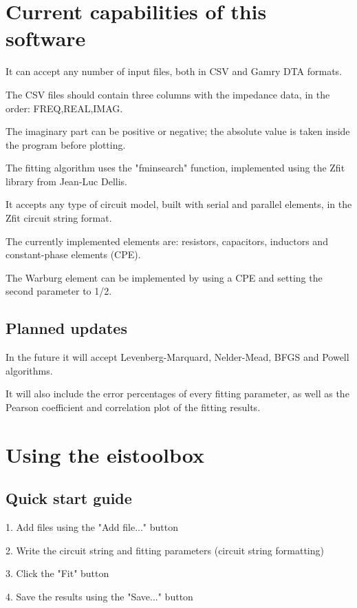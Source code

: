 \documentclass[10pt,a4paper,oneside]{book}
\begin{document}
\chapter{Current capabilities of this software}

It can accept any number of input files, both in CSV and Gamry DTA formats.

The CSV files should contain three columns with the impedance data, in the order: FREQ,REAL,IMAG. 

The imaginary part can be positive or negative; the absolute value is taken inside the program before plotting.

The fitting algorithm uses the "fminsearch" function, implemented using the Zfit library from Jean-Luc Dellis. 

It accepts any type of circuit model, built with serial and parallel elements, in the Zfit circuit string format.

The currently implemented elements are: resistors, capacitors, inductors and constant-phase elements (CPE). 

The Warburg element can be implemented by using a CPE and setting the second parameter to 1/2.


\section{Planned updates}

In the future it will accept Levenberg-Marquard, Nelder-Mead, BFGS and Powell algorithms.

It will also include the error percentages of every fitting parameter, as well as the Pearson coefficient and correlation plot of the fitting results.


\chapter{Using the eistoolbox}

\section{Quick start guide}

1. Add files using the "Add file..." button

2. Write the circuit string and fitting parameters (circuit string formatting)

3. Click the "Fit" button

4. Save the results using the "Save..." button
\end{document}
